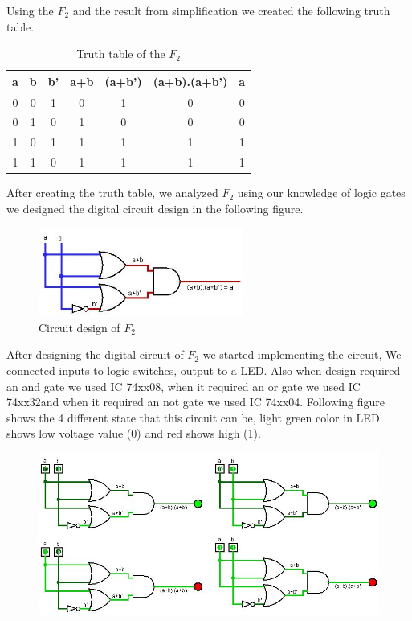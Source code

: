 \documentclass[pdftex,12pt,a4paper]{article}
\begin{document}
Using the $F_{2}$ and the result from simplification we created the following truth table.

\begin{table}[H]
\centering
\begin{tabular}{|c|c|c|c|c|c|c|}
\hline
a & b & b' & a+b  &(a+b')  &(a+b).(a+b') &a \\ \hline
0 & 0 & 1 & 0       & 1       & 0   & 0 \\ 
0 & 1 & 0 & 1       & 0       & 0   & 0 \\ 
1 & 0 & 1 & 1       & 1       & 1   & 1 \\ 
1 & 1 & 0 & 1       & 1       & 1   & 1 \\  \hline
\end{tabular}
\caption{Truth table of the $F_{2}$}
\label{Table 2}
\end{table}

After creating the truth table, we analyzed $F_{2}$ using our knowledge of logic gates we designed the digital circuit design in the following figure.

\begin{figure}[H]
	\centering
	\includegraphics[width=0.6\textwidth]{E2P1.2.1.jpg}
	\caption{Circuit design of $F_{2}$}
	\label{Figure 3}
\end{figure}

After designing the digital circuit of $F_{2}$ we started implementing the circuit, We connected inputs to logic switches, output to a LED. Also when design required an and gate we used IC 74xx08, when it required an or gate we used IC 74xx32and when it required an not gate we used IC 74xx04. Following figure shows the 4 different state that this circuit can be, light green color in LED shows low voltage value (0) and red shows high (1).

\begin{figure}[H]
	\centering
	\includegraphics[width=1\textwidth]{E2P1.2.2.jpg}
	\caption{}
	\label{Figure 4}
\end{figure}
\end{document}
